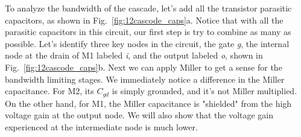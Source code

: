 To analyze the bandwidth of the cascade, let's add all the transistor parasitic capacitors, as shown in Fig.~\ref{fig:12cascode_caps}a.  Notice that with all the parasitic capacitors in this circuit, our first step is try to combine as many as possible.   Let's identify three key nodes in the circuit, the gate \emph{g}, the internal node at the drain of M1 labeled \emph{i}, and the output labeled \emph{o}, shown in Fig.~\ref{fig:12cascode_caps}b.  Next we can apply Miller to get a sense for the bandwidth limiting stages.  We immediately notice a difference in the Miller capacitance.  For M2, its $C_{gd}$ is simply grounded, and it's not Miller multiplied.  On the other hand, for M1, the Miller capacitance is "shielded" from the high voltage gain at the output node.  We will also show that the voltage gain experienced at the intermediate node is much lower.  
